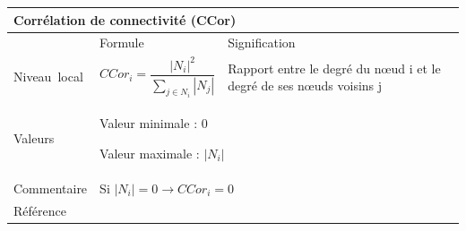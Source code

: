 \documentclass{article}
\begin{document}
\begin{table}[H]
\raggedright
\begin{tabular}{|m{3.24cm}|m{4.4810004cm}m{7.924cm}|}

\hline
\multicolumn{3}{|m{16.044998cm}|}{Corrélation de connectivité (CCor)}\\\hline
 &
\multicolumn{1}{m{4.4810004cm}|}{Formule} &
Signification\\\hline
Niveau~local 

 &
\multicolumn{1}{m{4.4810004cm}|}{\begin{equation*}
{\mathit{CCor}}_{i}=\frac{{\left|{N}_{i}\right|}^{2}}{\sum _{j{\in}{N}_{i}}{\left|{N}_{j}\right|}}
\end{equation*}
} &
Rapport entre le degré du nœud i et le degré de ses nœuds voisins j\\\hline
Valeurs &
\multicolumn{2}{m{12.6050005cm}|}{Valeur minimale : 0

Valeur maximale :  $\left|{N}_{i}\right|$}\\\hline
Commentaire &
\multicolumn{2}{m{12.6050005cm}|}{Si  $\left|{N}_{i}\right|=0\rightarrow {\mathit{CCor}}_{i}=0$}\\\hline
Référence &
\multicolumn{2}{m{12.6050005cm}|}{\cite{Minor2008}}\\\hline
\end{tabular}
\end{table}

\pagebreak



\end{document}
